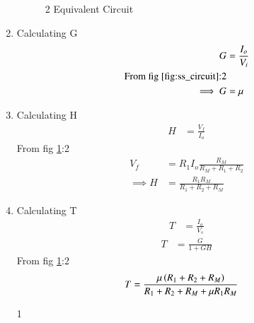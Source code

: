 \begin{enumerate}[label=\thesubsection.\arabic*.,ref=\thesubsection.\theenumi]
\begin{figure}[!ht]
	\begin{center}
		\resizebox{\columnwidth}{!}{}
	\end{center}
\caption{2 Equivalent Circuit}
\label{fig:ss_circuit}
\end{figure}
\item
Calculating G\\
\solution
\begin{align}
G &= \frac{I_{o}}{V_{i}} \label{eq:G}\\
\text{From fig \ref{fig:ss_circuit}:2}\\
\implies G&= \mu
\end{align}
\item
Calculating H\\
\solution
\begin{align}
H &= \frac{V_{f}}{I_{o}} \label{eq:H}
\end{align}
From fig \ref{fig:ss_circuit}:2\\
\begin{align}
V_{f}&=R_{1}I_{o}\frac{R_M}{R_M+R_1+R_2}\\
\implies
H &= \frac{R_1R_M}{R_1+R_2+R_M}
\end{align}
\item
Calculating T\\
\solution
\begin{align}
T &= \frac{I_{o}}{V_{s}} \label{eq:To}
\end{align}
\begin{align}
T &= \frac{G}{1+GH} \label{eq:T}
\end{align}
From fig \ref{fig:ss_circuit}:2
\begin{align}
T&= \frac{\mu \left(R_1+R_2+R_M\right)}{R_1+R_2+R_M+ \mu R_1R_M}
\end{align}


\begin{table}[!ht]
\centering

\caption{1}
\label{table: Input_Table}
\end{table}



\end{enumerate}
